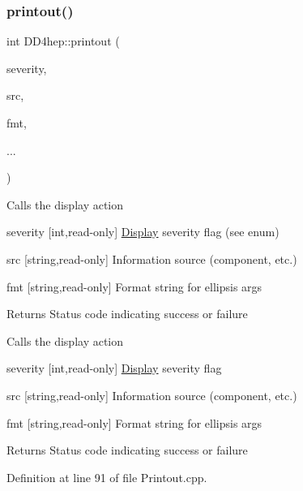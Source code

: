 \subsubsection{\texorpdfstring{printout()}{printout()}\hspace{0.1cm}{\footnotesize\ttfamily [1/8]}}
{\footnotesize\ttfamily int D\+D4hep\+::printout (\begin{DoxyParamCaption}\item[{\hyperlink{namespace_d_d4hep_a5b5a64d56252469451f2020a27d57d42}{Print\+Level}}]{severity,  }\item[{const char $\ast$}]{src,  }\item[{const char $\ast$}]{fmt,  }\item[{}]{... }\end{DoxyParamCaption})}

Calls the display action \begin{DoxyItemize}
\item severity \mbox{[}int,read-\/only\mbox{]} \hyperlink{class_d_d4hep_1_1_display}{Display} severity flag (see enum) \item src \mbox{[}string,read-\/only\mbox{]} Information source (component, etc.) \item fmt \mbox{[}string,read-\/only\mbox{]} Format string for ellipsis args \begin{DoxyReturn}{Returns}
Status code indicating success or failure
\end{DoxyReturn}
Calls the display action \item severity \mbox{[}int,read-\/only\mbox{]} \hyperlink{class_d_d4hep_1_1_display}{Display} severity flag \item src \mbox{[}string,read-\/only\mbox{]} Information source (component, etc.) \item fmt \mbox{[}string,read-\/only\mbox{]} Format string for ellipsis args \begin{DoxyReturn}{Returns}
Status code indicating success or failure 
\end{DoxyReturn}
\end{DoxyItemize}


Definition at line 91 of file Printout.\+cpp.



